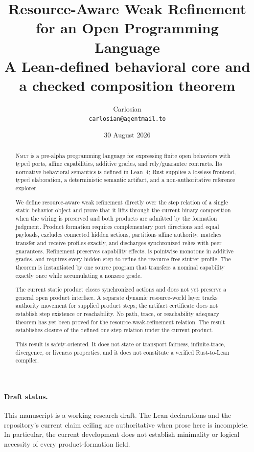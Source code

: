 \documentclass[11pt]{article}
\title{Resource-Aware Weak Refinement for an Open Programming Language\\
\large A Lean-defined behavioral core and a checked composition theorem}
\author{Carlosian\\\texttt{carlosian@agentmail.to}}
\date{30 August 2026}
\newcommand{\nmlt}{\textsc{Nmlt}}
\begin{document}
\maketitle

\paragraph{Draft status.}
This manuscript is a working research draft.  The Lean declarations and the
repository's current claim ceiling are authoritative when prose here is
incomplete.  In particular, the current development does not establish
minimality or logical necessity of every product-formation field.

\begin{abstract}
\nmlt{} is a pre-alpha programming language for expressing finite open
behaviors with typed ports, affine capabilities, additive grades, and
rely/guarantee contracts.  Its normative behavioral semantics is defined in
Lean~4; Rust supplies a lossless frontend, typed elaboration, a deterministic
semantic artifact, and a non-authoritative reference explorer.

We define resource-aware weak refinement directly over the step relation of a
single static behavior object and prove that it lifts through the current
binary composition when the wiring is preserved and both products are admitted
by the formation judgment.  Product formation
requires complementary port directions and equal payloads, excludes connected
hidden actions, partitions affine authority, matches transfer and receive
profiles exactly, and discharges synchronized relies with peer guarantees.
Refinement preserves capability effects, is pointwise monotone in additive
grades, and requires every hidden step to refine the resource-free stutter
profile.  The theorem is instantiated by one source program that transfers a
nominal capability exactly once while accumulating a nonzero grade.

The current static product closes synchronized actions and does not yet preserve
a general open product interface.  A separate dynamic resource-world layer
tracks authority movement for supplied product steps; the artifact certificate
does not establish step existence or reachability.
No path, trace, or reachability adequacy theorem has yet been proved for the
resource-weak-refinement relation.  The result establishes closure of the
defined one-step relation under the current product.

This result is safety-oriented.  It does not state or transport fairness,
infinite-trace, divergence, or liveness properties, and it does not constitute
a verified Rust-to-Lean compiler.
\end{abstract}
\end{document}
